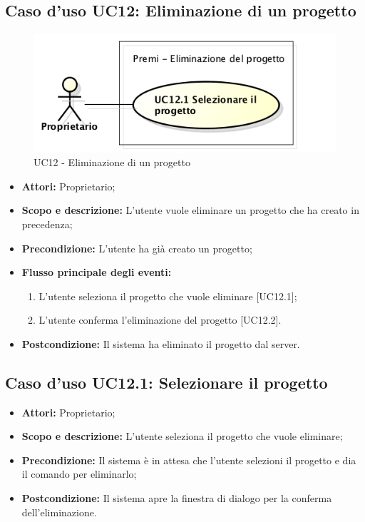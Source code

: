 \subsection{Caso d'uso UC12: Eliminazione di un progetto}
\begin{figure}[h] 
	\centering 
	\includegraphics[scale=0.45] {img/UC12.png}
	\caption{UC12 - Eliminazione di un progetto} 
\end{figure}

\begin{itemize}
	\item \textbf{Attori:} Proprietario;
	\item \textbf{Scopo e descrizione:} L'utente vuole eliminare un progetto che ha creato in precedenza;
	\item \textbf{Precondizione:} L'utente ha già creato un progetto;
	\item \textbf{Flusso principale degli eventi:}
	\begin{enumerate}
		\item L'utente seleziona il progetto che vuole eliminare [UC12.1];
		\item L'utente conferma l'eliminazione del progetto [UC12.2].
	\end{enumerate}
	\item \textbf{Postcondizione:} Il sistema ha eliminato il progetto dal server.
\end{itemize}


\subsection{Caso d'uso UC12.1: Selezionare il progetto}
\begin{itemize}
	\item \textbf{Attori:} Proprietario;
	\item \textbf{Scopo e descrizione:} L'utente seleziona il progetto che vuole eliminare;
	\item \textbf{Precondizione:} Il sistema è in attesa che l'utente selezioni il progetto e dia il comando per eliminarlo;
	\item \textbf{Postcondizione:} Il sistema apre la finestra di dialogo per la conferma dell'eliminazione.
\end{itemize}


